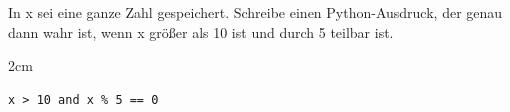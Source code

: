 \question[2]
In x sei eine ganze Zahl gespeichert. Schreibe einen Python-Ausdruck, der genau dann wahr ist, wenn x
größer als 10 ist und durch 5 teilbar ist.
\begin{solutionbox}{2cm}
\begin{lstlisting}
x > 10 and x % 5 == 0
\end{lstlisting}
\end{solutionbox}